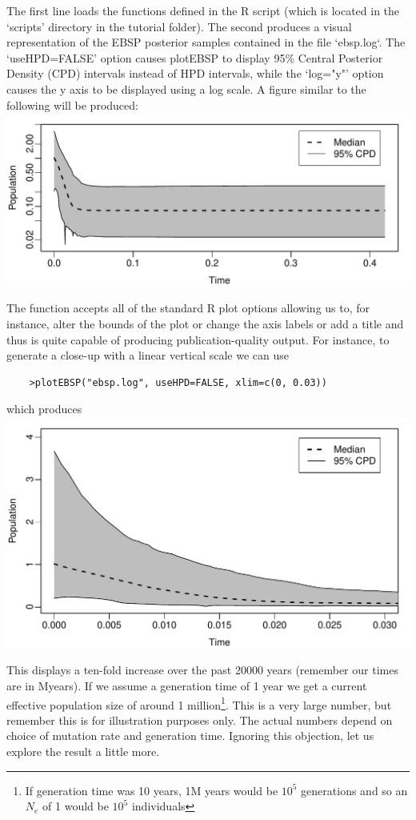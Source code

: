 \documentclass[a4paper,11pt]{article}
\begin{document}
The first line loads the functions defined in the R script (which is located in
the `scripts' directory in the tutorial folder). The second produces a visual
representation of the EBSP posterior samples contained in the file `ebsp.log`.
The `useHPD=FALSE' option causes plotEBSP to display 95\% Central Posterior
Density (CPD) intervals instead of HPD intervals, while the `log="y"' option
causes the y axis to be displayed using a log scale.  A figure similar to the
following will be produced:\\
\includegraphics[width=\textwidth]{figures/mystery1.pdf}

The function accepts all of the standard R plot options allowing us to, for
instance, alter the bounds of the plot or change the axis labels or add a title
and thus is quite capable of producing publication-quality output.  For
instance, to generate a close-up with a linear vertical scale we can use
\begin{verbatim}
    >plotEBSP("ebsp.log", useHPD=FALSE, xlim=c(0, 0.03))
\end{verbatim}
which produces\\
\includegraphics[width=\textwidth]{figures/mystery2.pdf}

This displays a ten-fold increase over the past 20000 years (remember our times
are in Myears). If we assume a generation time of 1 year we get a current
effective population size of around 1 million\footnote{If generation time was
    10 years, 1M years would be $10^5$ generations and so an $N_e$ of 1 would
    be $10^5$ individuals}. This is a very large number, but remember this is
for illustration purposes only. The actual numbers depend on choice of mutation
rate and generation time. Ignoring this objection, let us explore the result a
little more.
\end{document}
